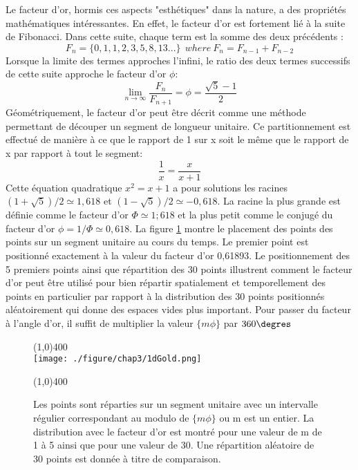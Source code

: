 Le facteur d'or, hormis ces aspects "esthétiques" dans la nature, a des propriétés mathématiques intéressantes. En effet, le facteur d'or est fortement lié à la suite de Fibonacci. Dans cette suite, chaque term est la somme des deux précédents :
\begin{equation}
F_n=\{0,1,1,2,3,5,8,13...\}\ \ where\ F_n=F_{n-1}+F_{n-2}
\end{equation}
Lorsque la limite des termes approches l'infini, le ratio des deux termes successifs de cette suite approche le facteur d'or $\phi$:
\begin{equation}
\lim_{n \to \infty}\frac{F_n}{F_{n+1}}=\phi=\frac{\sqrt{5}-1}{2}
\end{equation}
Géométriquement, le facteur d'or peut être décrit comme une méthode permettant de découper un segment de longueur unitaire. Ce partitionnement est effectué de manière à ce que le rapport de 1 sur x soit le même que le rapport de x par rapport à tout le segment:
\begin{equation}
\frac{1}{x}=\frac{x}{x+1}
\end{equation}
Cette équation quadratique $x^2=x+1$ a pour solutions les racines $(1+\sqrt{5})/2 \simeq 1,618$ et $(1-\sqrt{5})/2 \simeq -0,618$. La racine la plus grande est définie comme le facteur d'or $\Phi \simeq 1;618$ et la plus petit comme le conjugé du facteur d'or $\phi=1/\Phi\simeq0,618$.
La figure \ref{fig:1dGold} montre le placement des points des points sur un segment unitaire au cours du temps. Le premier point est positionné exactement à la valeur du facteur d'or 0,61893. Le positionnement des 5 premiers points ainsi que répartition des 30 points illustrent comment le facteur d'or peut être utilisé pour bien répartir spatialement et temporellement des points en particulier par rapport à la distribution des 30 points positionnés aléatoirement qui donne des espaces vides plus important.
Pour passer du facteur à l'angle d'or, il suffit de multiplier la valeur $\{m\phi\}$ par $360\degres$
\begin{figure}[H]
\centering \line(1,0){400} \\

\texttt{[image: ./figure/chap3/1dGold.png]}
\caption[Répartition 1D]{\label{fig:1dGold} Les points sont réparties sur un segment unitaire avec un intervalle régulier correspondant au modulo de $\{m\phi\}$ ou m est un entier. La distribution avec le facteur d'or est montré pour une valeur de m de 1 à 5 ainsi que pour une valeur de 30. Une répartition aléatoire de 30 points est donnée à titre de comparaison.}

\line(1,0){400} \\ \end{figure}

